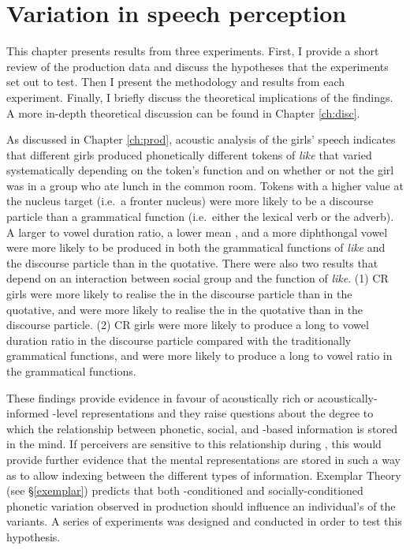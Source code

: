 \date{}
\chapter{Variation in speech perception}
\label{ch:perc}

\noindent This chapter presents results from three  experiments. First, I provide a short review of the production data and discuss the hypotheses that the experiments set out to test. Then I present the methodology and results from each experiment. Finally, I briefly discuss the theoretical implications of the findings. A more in-depth theoretical discussion can be found in Chapter \ref{ch:disc}.

As discussed in Chapter \ref{ch:prod}, acoustic analysis of the girls' speech indicates that different girls produced phonetically different tokens of \textit{like} that varied systematically depending on the token's function and on whether or not the girl was in a group who ate lunch in the common room. Tokens with a higher  value at the nucleus target (i.e.~a fronter nucleus) were more likely to be a discourse particle than a grammatical function (i.e.~either the lexical verb or the adverb). A larger  to vowel duration ratio, a lower mean , and a more diphthongal vowel were more likely to be produced in both the grammatical functions of \textit{like} and the discourse particle than in the quotative. There were also two results that depend on an interaction between social group and the function of \textit{like}. (1) CR girls were more likely to realise the  in the discourse particle than in the quotative, and  were more likely to realise the  in the quotative than in the discourse particle. (2) CR girls were more likely to produce a long  to vowel duration ratio in the discourse particle compared with the traditionally grammatical functions, and  were more likely to produce a long  to vowel ratio in the grammatical functions. 

These findings provide evidence in fa\-vour of acous\-tically rich or acous\-ti\-cally-informed -level representations and they raise questions about the degree to which the relationship between phonetic, social, and -based information is stored in the mind. If perceivers are sensitive to this relationship during , this would provide further evidence that the mental representations are stored in such a way as to allow indexing between the different types of information. Exemplar Theory (see \S \ref{exemplar}) predicts that both -conditioned and socially-conditioned phonetic variation observed in production should influence an individual's  of the variants. A series of  experiments was designed and conducted in order to test this hypothesis.


